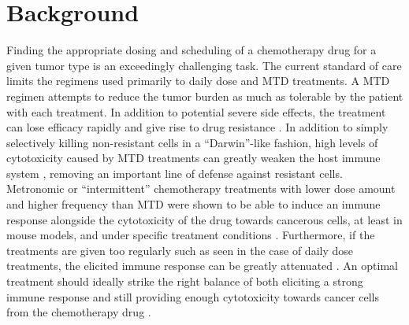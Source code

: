 \section{Background}
Finding the appropriate dosing and scheduling of a chemotherapy drug for a given tumor type is an exceedingly challenging task. The current standard of care limits the regimens used primarily to daily dose and \ac{MTD} treatments. A \ac{MTD} regimen attempts to reduce the tumor burden as much as tolerable by the patient with each treatment. In addition to potential severe side effects, the treatment can lose efficacy rapidly and give rise to drug resistance \cite{zahreddine2013mechanisms,kareva2015metronomic,shah2016limiting}. In addition to simply selectively killing non-resistant cells in a ``Darwin''-like fashion, high levels of cytotoxicity caused by \ac{MTD} treatments can greatly weaken the host immune system \cite{kareva2015metronomic}, removing an important line of defense against resistant cells. Metronomic or ``intermittent'' chemotherapy treatments with lower dose amount and higher frequency than \ac{MTD} were shown to be able to induce an immune response alongside the cytotoxicity of the drug towards cancerous cells, at least in mouse models, and under specific treatment conditions \cite{kepp2009immunogenic,kepp2011molecular,doloff2012vegf,kroemer2013immunogenic,vacchelli2014trial,bracci2014immune,wu2014metronomic,chen2014intermittent,bezu2015combinatorial,wu2015metronomic,wu2016metronomic}. Furthermore, if the treatments are given too regularly such as seen in the case of daily dose treatments, the elicited immune response can be greatly attenuated \cite{wu2014metronomic}. An optimal treatment should ideally strike the right balance of both eliciting a strong immune response and still providing enough cytotoxicity towards cancer cells from the chemotherapy drug \cite{park2019goldilocks,tran2020delicate}.

